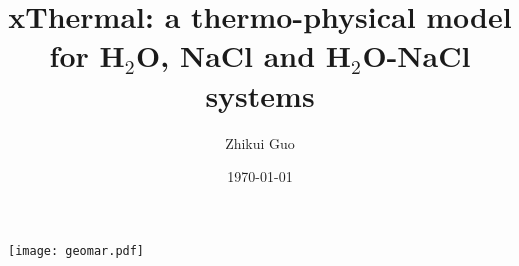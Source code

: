 
\title[xThermal]{\textbf{xThermal: a thermo-physical model \\ for H$_\text{2}$O, NaCl and H$_\text{2}$O-NaCl systems}} %


\author[Zhikui Guo]{Zhikui Guo}
\institute[GEOMAR] %

\date[]{\today}
\begin{frame}
	\titlepage %
	\begin{flushright}
		\texttt{[image: geomar.pdf]}
	\end{flushright}
\end{frame}



	
